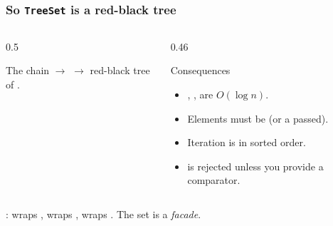 \documentclass[aspectratio=169,10pt,compress]{beamer}
\begin{document}
\begin{frame}[t,fragile] \frametitle{So \texttt{TreeSet} is a red-black tree}
  \begin{columns}[T]
    \begin{column}{0.5\textwidth}
      \begin{block}{The chain}
        \small
         $\to$  $\to$
        red-black tree of .
      \end{block}
    \end{column}
    \begin{column}{0.46\textwidth}
      \begin{block}{Consequences}
        \small
        \begin{itemize}
          \item {}, ,  are $O(\log n)$.
          \item Elements must be  (or a  passed).
          \item Iteration is in sorted order.
          \item {} is rejected unless you provide a comparator.
        \end{itemize}
      \end{block}
    \end{column}
  \end{columns}
  \vspace{0.5em}
  \small
  :  wraps ,
   wraps ,  wraps
  . The set is a \emph{facade}.
\end{frame}

\end{document}
